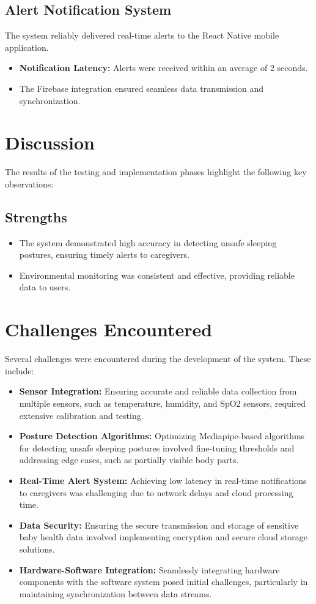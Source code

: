 \documentclass[12pt,a4paper]{report}
\begin{document}
\subsection{Alert Notification System}
The system reliably delivered real-time alerts to the React Native mobile application.
\begin{itemize}
    \item \textbf{Notification Latency:} Alerts were received within an average of 2 seconds.
    \item The Firebase integration ensured seamless data transmission and synchronization.
\end{itemize}

\section{Discussion}
The results of the testing and implementation phases highlight the following key observations:

\subsection{Strengths}
\begin{itemize}
    \item The system demonstrated high accuracy in detecting unsafe sleeping postures, ensuring timely alerts to caregivers.
    \item Environmental monitoring was consistent and effective, providing reliable data to users.
\end{itemize}
\section{Challenges Encountered}
Several challenges were encountered during the development of the system. These include:

\begin{itemize}
    \item \textbf{Sensor Integration:} Ensuring accurate and reliable data collection from multiple sensors, such as temperature, humidity, and SpO2 sensors, required extensive calibration and testing.
    \item \textbf{Posture Detection Algorithms:} Optimizing Mediapipe-based algorithms for detecting unsafe sleeping postures involved fine-tuning thresholds and addressing edge cases, such as partially visible body parts.
    \item \textbf{Real-Time Alert System:} Achieving low latency in real-time notifications to caregivers was challenging due to network delays and cloud processing time.
    \item \textbf{Data Security:} Ensuring the secure transmission and storage of sensitive baby health data involved implementing encryption and secure cloud storage solutions.
    \item \textbf{Hardware-Software Integration:} Seamlessly integrating hardware components with the software system posed initial challenges, particularly in maintaining synchronization between data streams.
\end{itemize}
\end{document}
